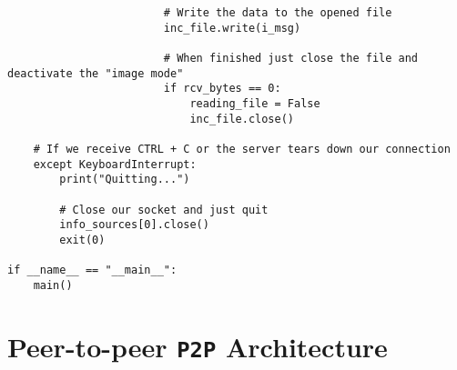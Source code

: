 \documentclass[landscape]{article}
\begin{document}
\begin{verbatim}
                        # Write the data to the opened file
                        inc_file.write(i_msg)

                        # When finished just close the file and deactivate the "image mode"
                        if rcv_bytes == 0:
                            reading_file = False
                            inc_file.close()

    # If we receive CTRL + C or the server tears down our connection
    except KeyboardInterrupt:
        print("Quitting...")

        # Close our socket and just quit
        info_sources[0].close()
        exit(0)

if __name__ == "__main__":
    main()
            \end{verbatim}

    \section{Peer-to-peer \texttt{P2P} Architecture}
\end{document}

